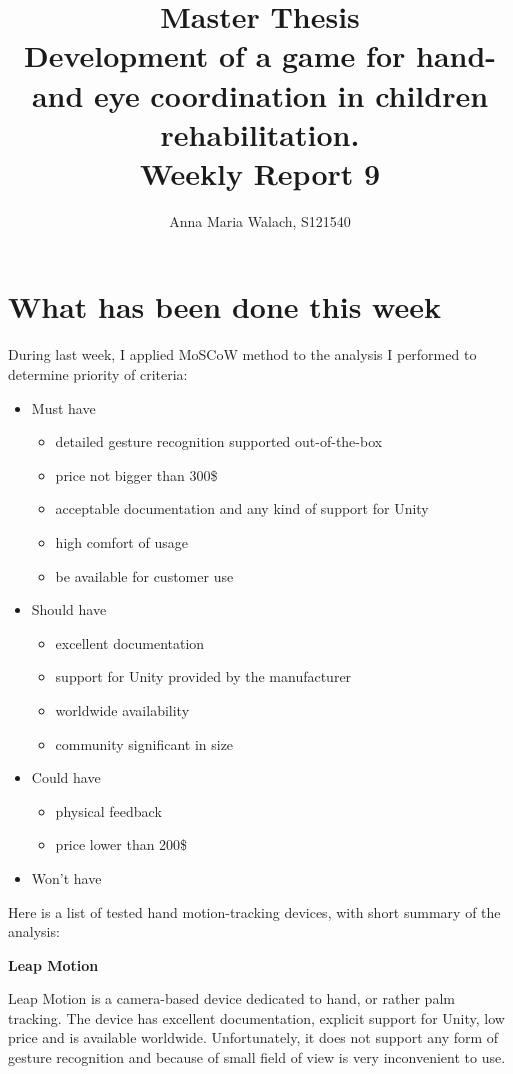 \documentclass[10pt,a4paper]{article}
\title{{Master Thesis\\[0.5em]}
       {\bf \huge Development of a game for hand- and eye coordination in children rehabilitation.\\[0.5em]}
       {\bf Weekly Report 9}}
\author{Anna Maria Walach, S121540}
\begin{document}
\maketitle

\section*{What has been done this week}
During last week, I applied MoSCoW method to the analysis I performed to determine priority of criteria:
\begin{itemize}
\item Must have
\begin{itemize}
\item detailed gesture recognition supported out-of-the-box
\item price not bigger than 300\$
\item acceptable documentation and any kind of support for Unity
\item high comfort of usage
\item be available for customer use
\end{itemize}
\item Should have
\begin{itemize}
\item excellent documentation
\item support for Unity provided by the manufacturer
\item worldwide availability 
\item community significant in size
\end{itemize}
\item Could have
\begin{itemize}
\item physical feedback
\item price lower than 200\$
\end{itemize}
\item Won't have
\end{itemize}

Here is a list of tested hand motion-tracking devices, with short summary of the analysis:

\textbf{Leap Motion}

Leap Motion is a camera-based device dedicated to hand, or rather palm tracking. The device has excellent documentation, explicit support for Unity, low price and is available worldwide. Unfortunately, it does not support any form of gesture recognition and because of small field of view is very inconvenient to use. 
\end{document}
